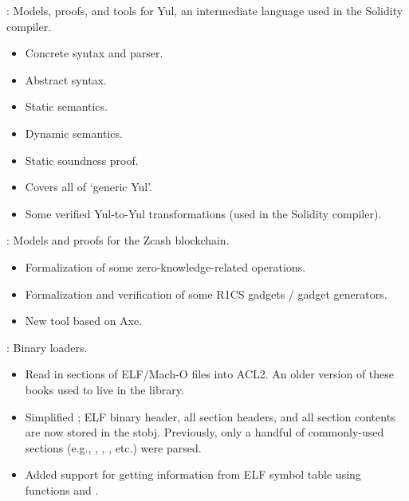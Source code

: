 \begin{frame}

\newlibtitle

:
Models, proofs, and tools for Yul,
an intermediate language used in the Solidity compiler.
\begin{itemize}
\item Concrete syntax and parser.
\item Abstract syntax.
\item Static semantics.
\item Dynamic semantics.
\item Static soundness proof.
\item Covers all of `generic Yul'.
\item Some verified Yul-to-Yul transformations (used in the Solidity compiler).
\end{itemize}

\end{frame}


\begin{frame}

\newlibtitle

:
Models and proofs for the Zcash blockchain.
\begin{itemize}
\item Formalization of some zero-knowledge-related operations.
\item Formalization and verification of some R1CS gadgets /
      gadget generators.
\item New  tool based on Axe.
\end{itemize}
\end{frame}


\begin{frame}

\newlibtitle

:
Binary loaders.
\begin{itemize}
\item Read in sections of ELF/Mach-O files into ACL2. An older version
      of these books used to live in the  library.
\item Simplified ; ELF binary header, all section
      headers, and all section contents are now stored in the 
      stobj. Previously, only a handful of commonly-used sections (e.g.,
      , , , etc.) were parsed.
\item Added support for getting information from ELF symbol table
      using functions  and
      .
\end{itemize}
\end{frame}

